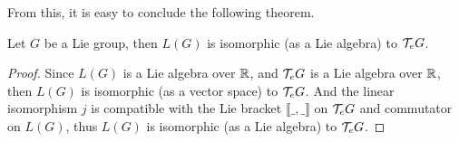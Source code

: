 From this, it is easy to conclude the following theorem.
\begin{theorem}
    Let \(G\) be a Lie group, then \(L(G)\) is isomorphic (as a Lie algebra) to \(\mathcal T_e G\).
\end{theorem}
\begin{proof}
    Since \(L(G)\) is a Lie algebra over \(\mathbb R\), and \(\mathcal T_e G\) is a Lie algebra over \(\mathbb R\), then \(L(G)\) is isomorphic (as a vector space) to \(\mathcal T_e G\). And the linear isomorphism \(j\) is compatible with the Lie bracket \(\llbracket \_, \_ \rrbracket\) on \(\mathcal T_e G\) and commutator on \(L(G)\), thus \(L(G)\) is isomorphic (as a Lie algebra) to \(\mathcal T_e G\).
\end{proof}
